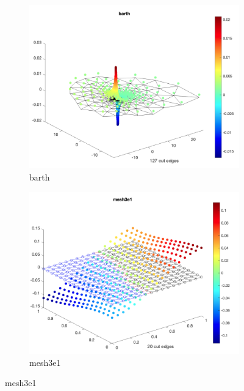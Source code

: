 \documentclass[unicode,11pt,a4paper,oneside,numbers=endperiod,openany]{scrartcl}
\begin{document}
\begin{figure}[htbp]
    \centering
    
    \begin{subfigure}[b]{0.4\textwidth}
        \includegraphics[width=\textwidth]{images/barth.png}
        \caption{barth}
    \end{subfigure}
    \hfill
    \begin{subfigure}[b]{0.4\textwidth}
        \includegraphics[width=\textwidth]{images/mesh3e1.png}
        \caption{mesh3e1} 
    \end{subfigure}
    
\end{figure}
\end{document}
